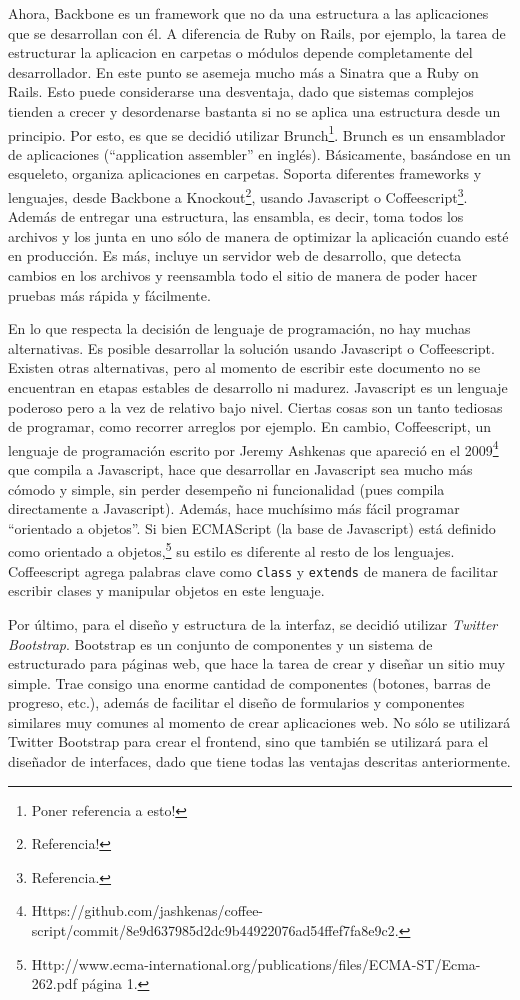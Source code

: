 \documentclass[12pt,titlepage,]{article}
\begin{document}
Ahora, Backbone es un framework que no da una estructura a las
aplicaciones que se desarrollan con él. A diferencia de Ruby on Rails,
por ejemplo, la tarea de estructurar la aplicacion en carpetas o módulos
depende completamente del desarrollador. En este punto se asemeja mucho
más a Sinatra que a Ruby on Rails. Esto puede considerarse una
desventaja, dado que sistemas complejos tienden a crecer y desordenarse
bastanta si no se aplica una estructura desde un principio. Por esto, es
que se decidió utilizar Brunch\footnote{Poner referencia a esto!}.
Brunch es un ensamblador de aplicaciones (``application assembler'' en
inglés). Básicamente, basándose en un esqueleto, organiza aplicaciones
en carpetas. Soporta diferentes frameworks y lenguajes, desde Backbone a
Knockout\footnote{Referencia!}, usando Javascript o
Coffeescript\footnote{Referencia.}. Además de entregar una estructura,
las ensambla, es decir, toma todos los archivos y los junta en uno sólo
de manera de optimizar la aplicación cuando esté en producción. Es más,
incluye un servidor web de desarrollo, que detecta cambios en los
archivos y reensambla todo el sitio de manera de poder hacer pruebas más
rápida y fácilmente.

En lo que respecta la decisión de lenguaje de programación, no hay
muchas alternativas. Es posible desarrollar la solución usando
Javascript o Coffeescript. Existen otras alternativas, pero al momento
de escribir este documento no se encuentran en etapas estables de
desarrollo ni madurez. Javascript es un lenguaje poderoso pero a la vez
de relativo bajo nivel. Ciertas cosas son un tanto tediosas de
programar, como recorrer arreglos por ejemplo. En cambio, Coffeescript,
un lenguaje de programación escrito por Jeremy Ashkenas que apareció en
el 2009\footnote{Https://github.com/jashkenas/coffee-script/commit/8e9d637985d2dc9b44922076ad54ffef7fa8e9c2.}
que compila a Javascript, hace que desarrollar en Javascript sea mucho
más cómodo y simple, sin perder desempeño ni funcionalidad (pues compila
directamente a Javascript). Además, hace muchísimo más fácil programar
``orientado a objetos''. Si bien ECMAScript (la base de Javascript) está
definido como orientado a objetos,\footnote{Http://www.ecma-international.org/publications/files/ECMA-ST/Ecma-262.pdf
  página 1.} su estilo es diferente al resto de los lenguajes.
Coffeescript agrega palabras clave como \texttt{class} y
\texttt{extends} de manera de facilitar escribir clases y manipular
objetos en este lenguaje.

Por último, para el diseño y estructura de la interfaz, se decidió
utilizar \emph{Twitter Bootstrap}. Bootstrap es un conjunto de
componentes y un sistema de estructurado para páginas web, que hace la
tarea de crear y diseñar un sitio muy simple. Trae consigo una enorme
cantidad de componentes (botones, barras de progreso, etc.), además de
facilitar el diseño de formularios y componentes similares muy comunes
al momento de crear aplicaciones web. No sólo se utilizará Twitter
Bootstrap para crear el frontend, sino que también se utilizará para el
diseñador de interfaces, dado que tiene todas las ventajas descritas
anteriormente.
\end{document}
